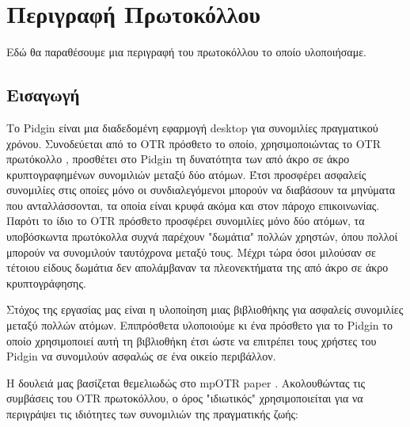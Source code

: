 
\chapter{Περιγραφή Πρωτοκόλλου}
\label{appendices:greek}

Εδώ θα παραθέσουμε μια περιγραφή του πρωτοκόλλου το οποίο υλοποιήσαμε.


\section{Εισαγωγή}
Το Pidgin είναι μια διαδεδομένη εφαρμογή desktop για συνομιλίες πραγματικού χρόνου.
Συνοδεύεται από το OTR πρόσθετο το οποίο, χρησιμοποιώντας το OTR πρωτόκολλο \cite{otr} \cite{otr_improvedauth} \cite{otr_userstudy}, προσθέτει στο Pidgin τη δυνατότητα των από άκρο σε άκρο κρυπτογραφημένων συνομιλιών μεταξύ δύο ατόμων.
Έτσι προσφέρει ασφαλείς συνομιλίες στις οποίες μόνο οι συνδιαλεγόμενοι μπορούν να διαβάσουν τα μηνύματα που ανταλλάσσονται, τα οποία είναι κρυφά ακόμα και στον πάροχο επικοινωνίας.
Παρότι το ίδιο το OTR πρόσθετο προσφέρει συνομιλίες μόνο δύο ατόμων, τα υποβόσκωντα πρωτόκολλα συχνά παρέχουν "δωμάτια" πολλών χρηστών, όπου πολλοί μπορούν να συνομιλούν ταυτόχρονα μεταξύ τους.
Μέχρι τώρα όσοι μιλούσαν σε τέτοιου είδους δωμάτια δεν απολάμβαναν τα πλεονεκτήματα της από άκρο σε άκρο κρυπτογράφησης.

Στόχος της εργασίας μας είναι η υλοποίηση μιας βιβλιοθήκης για ασφαλείς συνομιλίες μεταξύ πολλών ατόμων.
Επιπρόσθετα υλοποιούμε κι ένα πρόσθετο για το Pidgin το οποίο χρησιμοποιεί αυτή τη βιβλιοθήκη έτσι ώστε να επιτρέπει τους χρήστες του Pidgin να συνομιλούν ασφαλώς σε ένα οικείο περιβάλλον.

Η δουλειά μας βασίζεται θεμελιωδώς στο mpOTR paper \cite{mpotr}.
Ακολουθώντας τις συμβάσεις του OTR πρωτοκόλλου, ο όρος "ιδιωτικός" χρησιμοποιείται για να περιγράψει τις ιδιότητες των συνομιλιών της πραγματικής ζωής:

